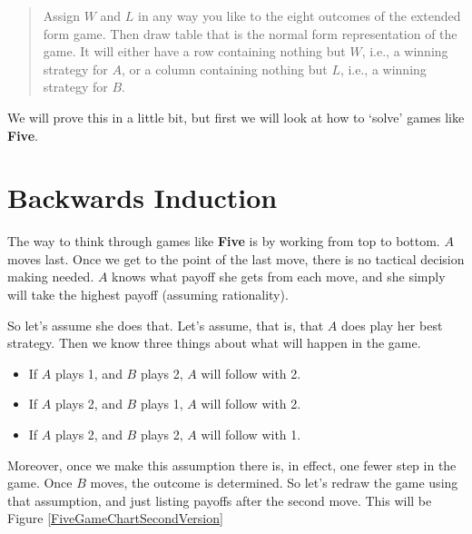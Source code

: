 \documentclass[openany]{book}
\begin{document}
\begin{quote}
Assign $W$ and $L$ in any way you like to the eight outcomes of the extended form game. Then draw table that is the normal form representation of the game. It will either have a row containing nothing but $W$, i.e., a winning strategy for $A$, or a column containing nothing but $L$, i.e., a winning strategy for $B$.
\end{quote}
We will prove this in a little bit, but first we will look at how to `solve' games like \textbf{Five}.

\section{Backwards Induction}

The way to think through games like \textbf{Five} is by working from top to bottom. $A$ moves last. Once we get to the point of the last move, there is no tactical decision making needed. $A$ knows what payoff she gets from each move, and she simply will take the highest payoff (assuming rationality).

So let's assume she does that. Let's assume, that is, that $A$ does play her best strategy. Then we know three things about what will happen in the game.

\begin{itemize}
\item If $A$ plays 1, and $B$ plays 2, $A$ will follow with 2.
\item If $A$ plays 2, and $B$ plays 1, $A$ will follow with 2.
\item If $A$ plays 2, and $B$ plays 2, $A$ will follow with 1.
\end{itemize}
Moreover, once we make this assumption there is, in effect, one fewer step in the game. Once $B$ moves, the outcome is determined. So let's redraw the game using that assumption, and just listing payoffs after the second move. This will be Figure \ref{FiveGameChartSecondVersion}
\end{document}
